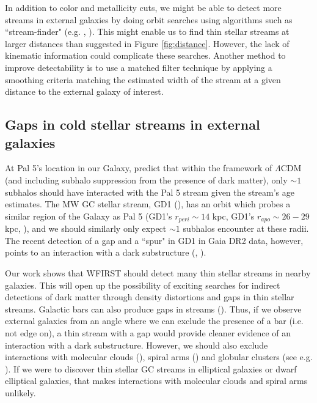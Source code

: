 \documentclass[twocolumn]{aastex62}
\begin{document}
In addition to color and metallicity cuts, we might be able to detect more streams in external galaxies by doing orbit searches using algorithms such as ``stream-finder" (e.g. \citealt{malhan18}, \citealt{ibata19}). This might enable us to find thin stellar streams at larger distances than suggested in Figure \ref{fig:distance}. However, the lack of kinematic information could complicate these searches. Another method to improve detectability is to use a matched filter technique by applying a smoothing criteria matching the estimated width of the stream at a given distance to the external galaxy of interest. 

\subsection{Gaps in cold stellar streams in external galaxies}
 At Pal 5's location in our Galaxy, \citet{bovy17} predict that within the framework of $\Lambda$CDM (and including subhalo suppression from the presence of dark matter), only $\sim 1$ subhalos should have interacted with the Pal 5 stream given the stream's age estimates. %
The MW GC stellar stream, GD1 (\citealt{grillmair06}), has an orbit which probes a similar region of the Galaxy as Pal 5 (GD1's $r_{peri} \sim 14$ kpc, GD1's $r_{apo} \sim 26-29$ kpc, \citealt{koposov10}), and we should similarly only expect  $\sim 1$ subhalos encounter at these radii. The recent detection of a gap and a ``spur" in GD1 in Gaia DR2 data, however, points to an interaction with a dark substructure (\citealt{price18}, \citealt{bonaca19}). %
 
Our work shows that WFIRST should detect many thin stellar streams in nearby galaxies. This will open up the possibility of exciting searches for indirect detections of dark matter through density distortions and gaps in thin stellar streams. Galactic bars can also produce gaps in streams (\citealt{pearson17}). Thus, if we observe external galaxies from an angle where we can exclude the presence of a bar (i.e. not edge on), a thin stream with a gap would provide cleaner evidence of an interaction with a dark substructure. However, we should also exclude interactions with molecular clouds (\citealt{amorisco16}), spiral arms (\citealt{banik19}) and globular clusters (see e.g. \citealt{bonaca19}). If we were to discover thin stellar GC streams in elliptical galaxies or dwarf elliptical galaxies, that makes interactions with molecular clouds and spiral arms unlikely. 
\end{document}
